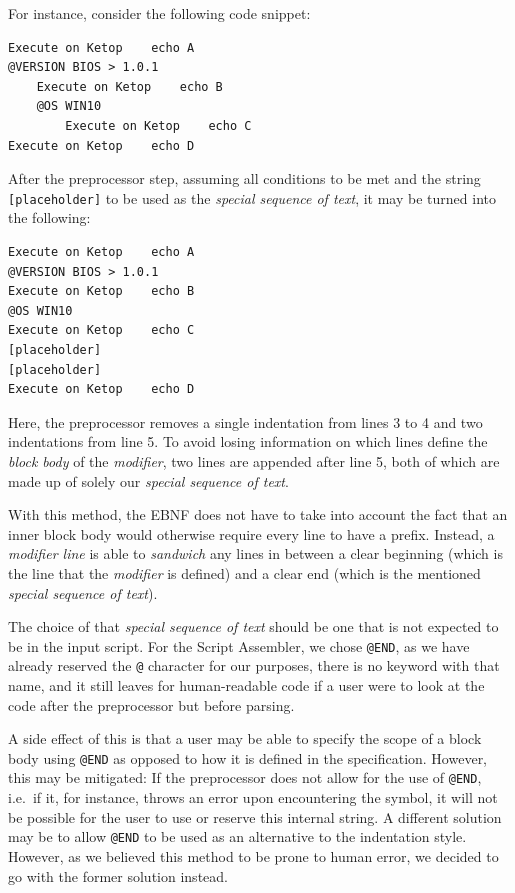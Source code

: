 For instance, consider the following code snippet:
\begin{lstlisting}[caption={Example of modifiers being used with indentation.}, label={lst:ebnf_special_sequence_example_before_preprocessor}]
Execute on Ketop    echo A
@VERSION BIOS > 1.0.1
    Execute on Ketop    echo B
    @OS WIN10
        Execute on Ketop    echo C
Execute on Ketop    echo D
\end{lstlisting}

After the preprocessor step, assuming all conditions to be met and the string \verb|[placeholder]| to be used as the \textit{special sequence of text}, it may be turned into the following:

\begin{lstlisting}[caption={A possible preprocessor output from listing~\ref{lst:ebnf_special_sequence_example_before_preprocessor}.}, label={lst:ebnf_special_sequence_example_after_preprocessor}]
Execute on Ketop    echo A
@VERSION BIOS > 1.0.1
Execute on Ketop    echo B
@OS WIN10
Execute on Ketop    echo C
[placeholder]
[placeholder]
Execute on Ketop    echo D
\end{lstlisting}

Here, the preprocessor removes a single indentation from lines 3 to 4 and two indentations from line 5. To avoid losing information on which lines define the \textit{block body} of the \textit{modifier}, two lines are appended after line 5, both of which are made up of solely our \textit{special sequence of text}.

With this method, the EBNF does not have to take into account the fact that an inner block body would otherwise require every line to have a prefix. Instead, a \textit{modifier line} is able to \textit{sandwich} any lines in between a clear beginning (which is the line that the \textit{modifier} is defined) and a clear end (which is the mentioned \textit{special sequence of text}).

The choice of that \textit{special sequence of text} should be one that is not expected to be in the input script. For the Script Assembler, we chose \verb|@END|, as we have already reserved the \verb|@| character for our purposes, there is no keyword with that name, and it still leaves for human-readable code if a user were to look at the code after the preprocessor but before parsing.

A side effect of this is that a user may be able to specify the scope of a block body using \verb|@END| as opposed to how it is defined in the specification. However, this may be mitigated: If the preprocessor does not allow for the use of \verb|@END|, i.e.\ if it, for instance, throws an error upon encountering the symbol, it will not be possible for the user to use or reserve this internal string. A different solution may be to allow \verb|@END| to be used as an alternative to the indentation style. However, as we believed this method to be prone to human error, we decided to go with the former solution instead.
